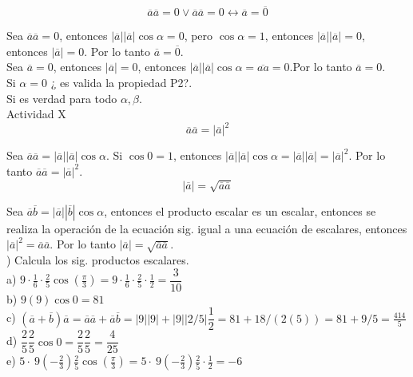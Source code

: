 \documentclass[11pt,a4paper]{article}
\begin{document}
\begin{justify}
$$ \overline{a}\overline{a} = 0 \vee \overline{a}\overline{a} = 0 \leftrightarrow \overline{a} = \overline{0} $$

\noindent
Sea $\overline{a}\overline{a} = 0$, entonces $|\overline{a}||\overline{a}| \cos \alpha = 0$, pero $\cos \alpha = 1$, entonces $|\overline{a}||\overline{a}| = 0$, entonces $|\overline{a}|= 0$. Por lo tanto $\overline{a} = \overline{0}$.\\

\noindent
Sea $\overline{a} = 0$, entonces $|\overline{a}| = 0$, entonces $|\overline{a}||\overline{a}|\cos \alpha = \overline{aa} = 0$.Por lo tanto $\overline{a} = 0 $.\\

\noindent
Si $\alpha = 0$ ¿ es valida la propiedad P2?.\\

\noindent
Si es verdad para todo $\alpha, \beta$.\\

\noindent
Actividad X\\

$$ \overline{a}\overline{a} = |\overline{a}|^2 $$

\noindent
Sea $\overline{a}\overline{a} = |\overline{a}||\overline{a}|\cos \alpha $. Si $\cos 0 = 1$, entonces $|\overline{a}||\overline{a}|\cos \alpha = |\overline{a}||\overline{a}|= |\overline{a}|^2$. Por lo tanto  $ \overline{a}\overline{a} = |\overline{a}|^2 $.\\

 $$ |\overline{a}| = \sqrt{\overline{a}\overline{a}} $$
 
Sea $\overline{a}\overline{b} = |\overline{a}||\overline{b}|\cos \alpha$, entonces el producto escalar es un escalar, entonces se realiza la operación de la ecuación sig. igual a una ecuación de escalares, entonces $|\overline{a}|^2 = \overline{a}\overline{a}$. Por lo tanto $|\overline{a}| = \sqrt{\overline{a}\overline{a}}$.\\

) Calcula los sig. productos escalares.\\

\noindent
a) $9\cdot \frac{1}{6}\cdot \frac{2}{5}\cos \left(\frac{\pi }{3}\right)=9\cdot \frac{1}{6}\cdot \frac{2}{5}\cdot \frac{1}{2}= \dfrac{3}{10}$\\
b) $ 9(9)\cos 0 = 81$\\
c) $(\overline{a}+\overline{b})\overline{a} = \overline{a}\overline{a}+\overline{a}\overline{b} = |9||9|+|9||2/5| \dfrac{1}{2} = 81 +18/(2(5)) = 81 + 9/5 = \frac{414}{5} $\\
d) $ \dfrac{2}{5}\dfrac{2}{5} \cos 0 = \dfrac{2}{5}\dfrac{2}{5}= \dfrac{4}{25}$\\
e) $5\cdot \:9\left(-\frac{2}{3}\right)\frac{2}{5}\cos \left(\frac{\pi }{3}\right) = 5\cdot \:9\left(-\frac{2}{3}\right)\frac{2}{5}\cdot \frac{1}{2} = -6$\\



\end{justify}
\end{document}
